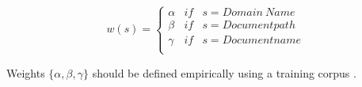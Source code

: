 \begin{equation}\label{eq:jebary_url_weigh_cngrams_2}
	w(s) = \left\{
    	\begin{array}{lll}
        	\alpha & if & s = Domain\ Name \\
            \beta & if & s = Document path \\
            \gamma & if & s = Document name \\
         \end{array}
  \right.
\end{equation}

Weights $\{\alpha,\beta,\gamma\}$ should be defined empirically using a training corpus . 






